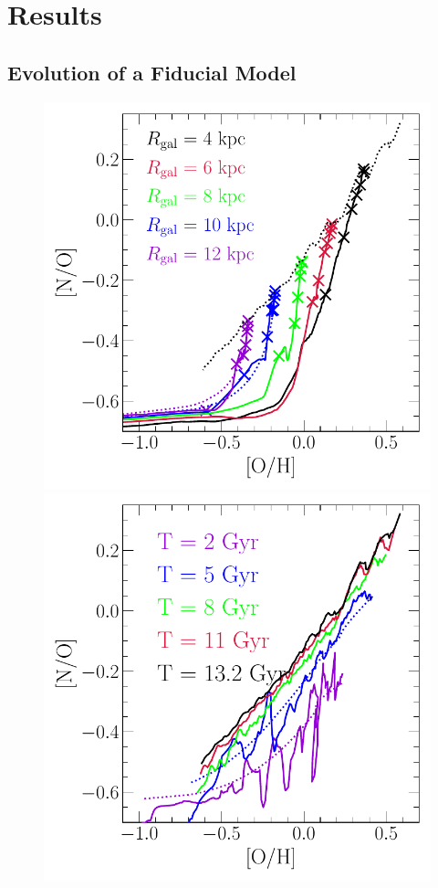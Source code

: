 \documentclass[ms.tex]{subfiles}
\begin{document}
\section{Results}
\label{sec:results}

\subsection{Evolution of a Fiducial Model}
\label{sec:results:fiducial}

\begin{figure}
\centering
\includegraphics[scale = 0.63]{no_oh_superposition.pdf}
\includegraphics[scale = 0.63]{no_oh_timeevol.pdf}

\end{figure}
\end{document}

